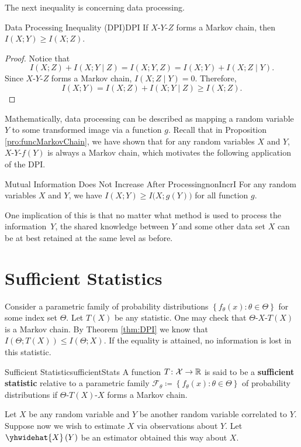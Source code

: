 \documentclass[math, code]{amznotes}
\theoremstyle{remark}
\begin{document}
The next inequality is concerning data processing.
\begin{thmbox}{Data Processing Inequality (DPI)}{DPI}
    If $X$-$Y$-$Z$ forms a Markov chain, then $I\left(X ; Y\right) \geq I\left(X ; Z\right)$.
    \tcblower
    \begin{proof}
        Notice that 
        \begin{equation*}
            I\left(X ; Z\right) + I\left(X ; Y \mid Z\right) = I\left(X ; Y, Z\right) = I\left(X ; Y\right) + I\left(X; Z \mid Y\right).
        \end{equation*}
        Since $X$-$Y$-$Z$ forms a Markov chain, $I\left(X ; Z \mid Y\right) = 0$. Therefore, 
        \begin{equation*}
            I\left(X ; Y\right) = I\left(X ; Z\right) + I\left(X ; Y \mid Z\right) \geq I\left(X ; Z\right).
        \end{equation*}
    \end{proof}
\end{thmbox}
Mathematically, data processing can be described as mapping a random variable $Y$ to some transformed image via a function $g$. Recall that in Proposition \ref{pro:funcMarkovChain}, we have shown that for any random variables $X$ and $Y$, $X$-$Y$-$f\left(Y\right)$ is always a Markov chain, which motivates the following application of the DPI.
\begin{corbox}{Mutual Information Does Not Increase After Processing}{nonIncrI}
    For any random variables $X$ and $Y$, we have $I\left(X ; Y\right) \geq I\bigl(X ; g\left(Y\right)\bigr)$ for all function $g$.
\end{corbox}
One implication of this is that no matter what method is used to process the information~$Y$, the shared knowledge between $Y$ and some other data set $X$ can be at best retained at the same level as before.
\section{Sufficient Statistics}
Consider a parametric family of probability distributions $\left\{f_{\theta}\left(x\right) \colon \theta \in \Theta\right\}$ for some index set $\Theta$. Let $T\left(X\right)$ be any statistic. One may check that $\Theta$-$X$-$T\left(X\right)$ is a Markov chain. By Theorem \ref{thm:DPI} we know that $I\left(\Theta ; T\left(X\right)\right) \leq I\left(\Theta ; X\right)$. If the equality is attained, no information is lost in this statistic.
\begin{dfnbox}{Sufficient Statistic}{sufficientStats}
    A function $T \colon \mathcal{X} \to \mathbb{R}$ is said to be a {\color{red} \textbf{sufficient statistic}} relative to a parametric family $\mathcal{F}_{\theta} \coloneqq \left\{f_{\theta}\left(x\right) \colon \theta \in \Theta\right\}$ of probability distributions if $\Theta$-$T\left(X\right)$-$X$ forms a Markov chain.
\end{dfnbox}
Let $X$ be any random variable and $Y$ be another random variable correlated to $Y$. Suppose now we wish to estimate $X$ via observations about $Y$. Let $\yhwidehat{X}\left(Y\right)$ be an estimator obtained this way about $X$.
\end{document}
